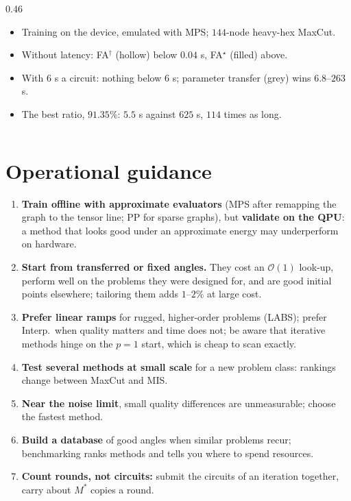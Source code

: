 \documentclass[handoutsbeamer.tex]{subfiles}
\begin{document}
\begin{frame}
{\begin{columns}[c]
\begin{column}{0.46\textwidth}
\begin{itemize}
    \item Training on the device, emulated with MPS; $144$-node heavy-hex MaxCut.
    \item Without latency: FA$^\dagger$ (hollow) below $0.04$ s, FA$^\star$ (filled) above.
    \item With $6$ s a circuit: nothing below $6$ s; parameter transfer (grey) wins $6.8$--$263$ s.
    \item The best ratio, $91.35\%$: $5.5$ s against $625$ s, $114$ times as long.
\end{itemize}\end{column}\end{columns}}
\end{frame}

\section{Operational guidance}

\begin{frame}
\onp{\footnotesize}
\begin{enumerate}\setlength\itemsep{0.2em}
    \item \textbf{Train offline with approximate evaluators} (MPS after remapping the graph to the tensor line; PP for sparse graphs), but \textbf{validate on the QPU}: a method that looks good under an approximate energy may underperform on hardware.
    \item \textbf{Start from transferred or fixed angles.} They cost an $\mathcal O(1)$ look-up, perform well on the problems they were designed for, and are good initial points elsewhere; tailoring them adds $1$--$2\%$ at large cost.
    \item \textbf{Prefer linear ramps} for rugged, higher-order problems (LABS); prefer Interp.\ when quality matters and time does not; be aware that iterative methods hinge on the $p=1$ start, which is cheap to scan exactly.
    \item \textbf{Test several methods at small scale} for a new problem class: rankings change between MaxCut and MIS.
    \item \textbf{Near the noise limit}, small quality differences are unmeasurable; choose the fastest method.
    \item \textbf{Build a database} of good angles when similar problems recur; benchmarking ranks methods and tells you where to spend resources.
    \item \textbf{Count rounds, not circuits:} submit the circuits of an iteration together, carry about $M^*$ copies a round.
\end{enumerate}
\end{frame}
\end{document}
